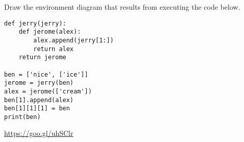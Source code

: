 \begin{blocksection}
\question Draw the environment diagram that results from executing the code below.
\begin{lstlisting}
def jerry(jerry):
    def jerome(alex):
        alex.append(jerry[1:])
        return alex
    return jerome
			
ben = ['nice', ['ice']]
jerome = jerry(ben)
alex = jerome(['cream'])
ben[1].append(alex)
ben[1][1][1] = ben
print(ben)
\end{lstlisting}

\begin{solution}[1.5in]
\url{https://goo.gl/uhSClr}
\end{solution}
\end{blocksection}
